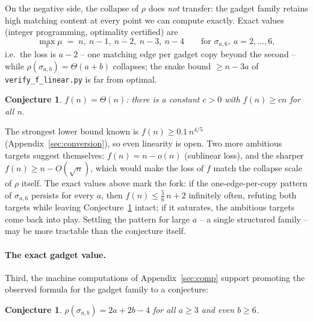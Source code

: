\documentclass[11pt]{article}
\newtheorem{conjecture}[theorem]{Conjecture}
\theoremstyle{definition}
\begin{document}
On the negative side, the collapse of $\rho$ does \emph{not} transfer: the
gadget family retains high matching content at every point we can compute
exactly. Exact values (integer programming, optimality certified) are
\[
\max_\pi \mu \;=\; n,\ n-1,\ n-2,\ n-3,\ n-4 \qquad \text{for } \sigma_{a,6},\ a = 2,\dots,6,
\]
i.e.\ the loss is $a-2$ -- one matching edge per gadget copy beyond the second
-- while $\rho(\sigma_{a,b}) = \Theta(a+b)$ collapses; the snake bound
$\ge n - 3a$ of \texttt{verify\_f\_linear.py} is far from optimal.

\begin{conjecture}\label{conj:flinear}
$f(n) = \Theta(n)$: there is a constant $c > 0$ with $f(n) \ge cn$ for all $n$.
\end{conjecture}

The strongest lower bound known is $f(n) \ge 0.1\, n^{4/5}$
(Appendix~\ref{sec:conversion}), so even linearity is open. Two more ambitious
targets suggest themselves: $f(n) = n - o(n)$ (sublinear loss), and the sharper
$f(n) \ge n - O(\sqrt n)$, which would make the loss of $f$ match the collapse
scale of $\rho$ itself. The exact values above mark the fork: if the
one-edge-per-copy pattern of $\sigma_{a,6}$ persists for every $a$, then
$f(n) \le \tfrac{5}{6}\,n + 2$ infinitely often, refuting both targets while
leaving Conjecture~\ref{conj:flinear} intact; if it saturates, the ambitious
targets come back into play. Settling the pattern for large $a$ -- a single
structured family -- may be more tractable than the conjecture itself.

\paragraph{The exact gadget value.}
Third, the machine computations of Appendix~\ref{sec:comp} support promoting
the observed formula for the gadget family to a conjecture:

\begin{conjecture}\label{conj:exactgadget}
$\rho(\sigma_{a,b}) = 2a + 2b - 4$ for all $a \ge 3$ and even $b \ge 6$.
\end{conjecture}
\end{document}
